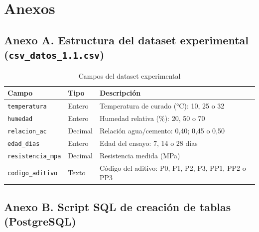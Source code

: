 \documentclass[12pt, letterpaper]{article}
\begin{document}
\newpage
{}
\printbibliography[title={Referencias bibliográficas}]

\newpage
\section*{Anexos}

\subsection*{Anexo A. Estructura del dataset experimental (\texttt{csv\_datos\_1.1.csv})}

\begin{table}[H]
  \centering
  \caption{Campos del dataset experimental}
  \begin{tabular}{lll}
    \hline
    Campo & Tipo & Descripción \\
    \hline
    \texttt{temperatura}      & Entero  & Temperatura de curado (°C): 10, 25 o 32 \\
    \texttt{humedad}          & Entero  & Humedad relativa (\%): 20, 50 o 70 \\
    \texttt{relacion\_ac}     & Decimal & Relación agua/cemento: 0{,}40; 0{,}45 o 0{,}50 \\
    \texttt{edad\_dias}       & Entero  & Edad del ensayo: 7, 14 o 28 días \\
    \texttt{resistencia\_mpa} & Decimal & Resistencia medida (MPa) \\
    \texttt{codigo\_aditivo}  & Texto   & Código del aditivo: P0, P1, P2, P3, PP1, PP2 o PP3 \\
    \hline
  \end{tabular}
\end{table}

\subsection*{Anexo B. Script SQL de creación de tablas (PostgreSQL)}
\end{document}
